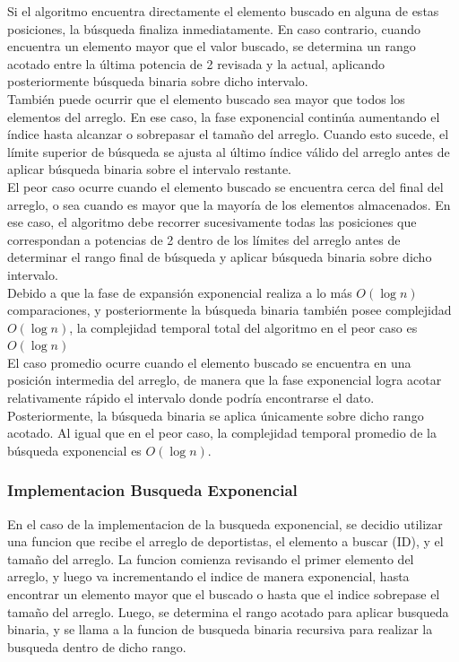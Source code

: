 Si el algoritmo encuentra directamente el elemento buscado en alguna de estas posiciones, la búsqueda finaliza inmediatamente. En caso contrario, cuando encuentra 
un elemento mayor que el valor buscado, se determina un rango acotado entre la última potencia de 2 revisada y la actual, aplicando posteriormente búsqueda binaria
sobre dicho intervalo. \\

También puede ocurrir que el elemento buscado sea mayor que todos los elementos del arreglo. En ese caso, la fase exponencial continúa aumentando el índice hasta 
alcanzar o sobrepasar el tamaño del arreglo. Cuando esto sucede, el límite superior de búsqueda se ajusta al último índice válido del arreglo antes de aplicar 
búsqueda binaria sobre el intervalo restante. \\

El peor caso ocurre cuando el elemento buscado se encuentra cerca del final del arreglo, o sea cuando es mayor que la mayoría de los elementos almacenados. 
En ese caso, el algoritmo debe recorrer sucesivamente todas las posiciones que correspondan a potencias de 2 dentro de los límites del arreglo antes de determinar 
el rango final de búsqueda y aplicar búsqueda binaria sobre dicho intervalo. \\

Debido a que la fase de expansión exponencial realiza a lo más \(O(\log n)\) comparaciones, y posteriormente la búsqueda binaria también posee complejidad 
\(O(\log n)\), la complejidad temporal total del algoritmo en el peor caso es $O(\log n)$ \\

El caso promedio ocurre cuando el elemento buscado se encuentra en una posición intermedia del arreglo, de manera que la fase exponencial logra acotar relativamente 
rápido el intervalo donde podría encontrarse el dato.  Posteriormente, la búsqueda binaria se aplica únicamente sobre dicho rango acotado.  Al igual que en el peor caso, 
la complejidad temporal promedio de la búsqueda exponencial es $O(\log n)$. \\

\subsubsection{Implementacion Busqueda Exponencial}
En el caso de la implementacion de la busqueda exponencial, se decidio utilizar una funcion que recibe el arreglo de deportistas, el elemento a buscar (ID), y el 
tamaño del arreglo.  La funcion comienza revisando el primer elemento del arreglo, y luego va incrementando el indice de manera exponencial, hasta encontrar un 
elemento mayor que el buscado o hasta que el indice sobrepase el tamaño del arreglo.  Luego, se determina el rango acotado para aplicar busqueda binaria, y se 
llama a la funcion de busqueda binaria recursiva para realizar la busqueda dentro de dicho rango.


